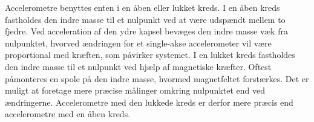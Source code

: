 Accelerometre benyttes enten i en åben eller lukket kreds. I en åben kreds fastholdes den indre masse til et nulpunkt ved at være udspændt mellem to fjedre. Ved acceleration af den ydre kapsel bevæges den indre masse væk fra nulpunktet, hvorved ændringen for et single-akse accelerometer vil være proportional med kræften, som påvirker systemet. \newline
I en lukket kreds fastholdes den indre masse til et nulpunkt ved hjælp af magnetiske kræfter. Oftest påmonteres en spole på den indre masse, hvormed magnetfeltet forstærkes. Det er muligt at foretage mere præcise målinger omkring nulpunktet end ved ændringerne. Accelerometre med den lukkede kreds er derfor mere præcis end accelerometre med en åben kreds. \citep{TittertonWeston2004,Academic2016d,Serway2010}
